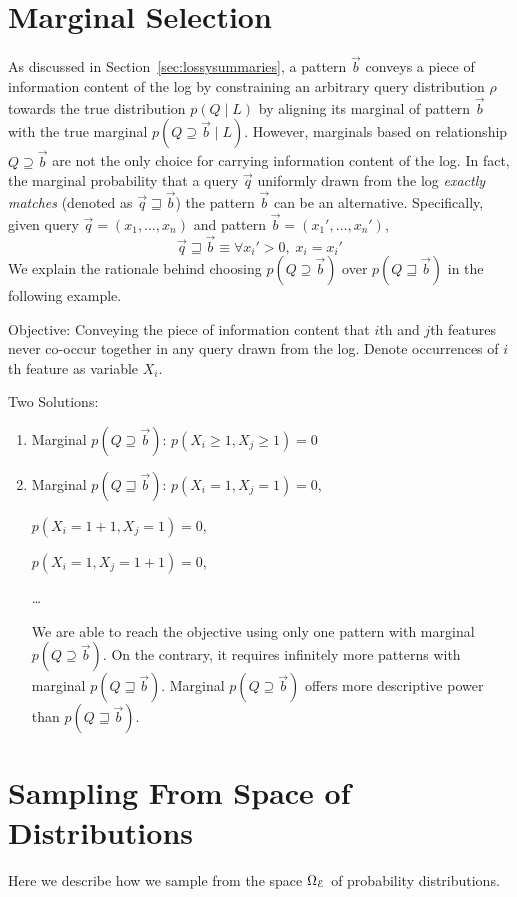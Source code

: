 \begin{appendices}
\section{Marginal Selection}
\label{appendix:marginalselectionforpatternbasedsummary}
As discussed in Section~\ref{sec:lossysummaries}, a pattern $\vec b$ conveys a piece of information content of the log by constraining an arbitrary query distribution $\rho$ towards the true distribution $p(Q\;|\;L)$ by aligning its marginal of pattern $\vec b$ with the true marginal $p(Q\supseteq\vec{b}\;|\;L)$. 
However, marginals based on relationship $Q\supseteq\vec b$ are not the only choice for carrying information content of the log. 
In fact, the marginal probability that a query $\vec{q}$ uniformly drawn from the log \textit{exactly matches} (denoted as $\vec{q}\sqsupseteq\vec{b}$) the pattern $\vec{b}$ can be an alternative. Specifically, given query $\vec{q}=(x_1,\ldots,x_n)$ and pattern $\vec{b}=(x_1',\ldots,x_n')$, 
$$\vec{q}\sqsupseteq\vec{b}\equiv\forall x_i'>0,\;x_i=x_i'$$
We explain the rationale behind choosing $p(Q\supseteq\vec{b})$ over $p(Q\sqsupseteq\vec{b})$ in the following example.
\begin{example}
Objective: Conveying the piece of information content that $i$th and $j$th features never co-occur together in any query drawn from the log.
Denote occurrences of $i$th feature as variable $X_i$.

Two Solutions: 
\begin{enumerate}
\item Marginal $p(Q\supseteq\vec{b})$: $p(X_i\geq 1,X_j\geq 1)=0$

\item Marginal $p(Q\sqsupseteq\vec{b})$:
$p(X_i=1,X_j=1)=0$,

$p(X_i=1+1,X_j=1)=0$,

$p(X_i=1,X_j=1+1)=0$,

\ldots

We are able to reach the objective using only one pattern with marginal $p(Q\supseteq\vec{b})$. 
On the contrary, it requires infinitely more patterns with marginal $p(Q\sqsupseteq\vec{b})$.
Marginal $p(Q\supseteq\vec{b})$ offers more descriptive power than $p(Q\sqsupseteq\vec{b})$.
\end{enumerate}
\end{example}

\section{Sampling From Space of Distributions}
\label{appendix:sampling}
Here we describe how we sample from the space $\Omega_\mathcal E$ of probability distributions.

\end{appendices}
